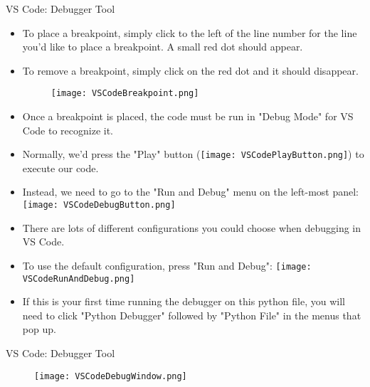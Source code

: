 \documentclass[10pt, aspectratio=169]{beamer}
\begin{document}
\begin{frame}{VS Code: Debugger Tool}
    \begin{itemize}
        \item To place a breakpoint, simply click to the left of the line number for the line you'd like to place a breakpoint. A small red dot should appear.
        \item To remove a breakpoint, simply click on the red dot and it should disappear.
        \begin{figure}
            \texttt{[image: VSCodeBreakpoint.png]}
        \end{figure}
        \item Once a breakpoint is placed, the code must be run in "Debug Mode" for VS Code to recognize it.
        \item Normally, we'd press the "Play" button (\texttt{[image: VSCodePlayButton.png]}) to execute our code.
        \item Instead, we need to go to the "Run and Debug" menu on the left-most panel: \texttt{[image: VSCodeDebugButton.png]}
        \item There are lots of different configurations you could choose when debugging in VS Code.
        \item To use the default configuration, press "Run and Debug": \texttt{[image: VSCodeRunAndDebug.png]}
        \item If this is your first time running the debugger on this python file, you will need to click "Python Debugger" followed by "Python File" in the menus that pop up.
    \end{itemize}
\end{frame}

\begin{frame}{VS Code: Debugger Tool}
    \begin{figure}
        \texttt{[image: VSCodeDebugWindow.png]}
    \end{figure}
\end{frame}
\end{document}
